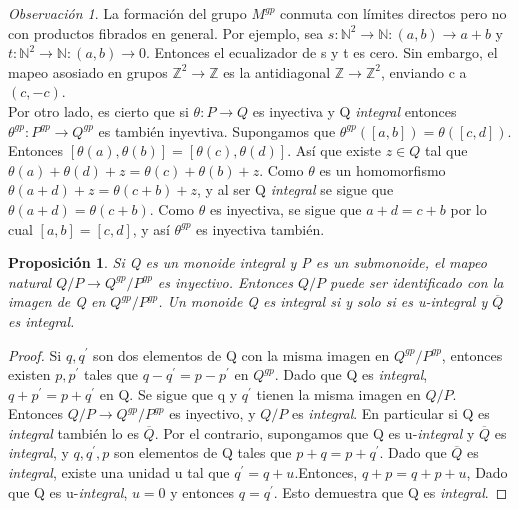 \documentclass[12pt,spanish]{amsart}
\newcommand{\bb}[1]{\mathbb{#1}}
\newtheorem{prop}[Theorem]{Proposición}
\theoremstyle{definition}
\theoremstyle{remark}
\newtheorem{obs}[Theorem]{Observación}
\begin{document}
\begin{obs}
La formación del grupo $M^{gp}$ conmuta con límites directos pero no con productos fibrados en general. Por ejemplo, sea $s:\bb{N}^{2} \to \bb{N}:(a,b)\to a+b$ y $t:\bb{N}^{2} \to \bb{N}:(a,b) \to 0$. Entonces el ecualizador de s y t es cero. Sin embargo, el mapeo asosiado en grupos $\bb{Z}^{2} \to \bb{Z}$ es la antidiagonal $\bb{Z} \to \bb{Z}^{2}$, enviando c a $(c,-c)$. \\

Por otro lado, es cierto que si $\theta:P \to Q$ es inyectiva y Q \textit{integral} entonces $\theta^{gp}:P^{gp} \to Q^{gp}$ es también inyevtiva. Supongamos que $\theta^{gp}([a,b])=\theta([c,d])$. Entonces $[\theta(a),\theta(b)]=[\theta(c),\theta(d)]$. Así que existe $z\in Q$ tal que $\theta(a)+\theta(d)+z=\theta(c)+\theta(b)+z$. Como $\theta$ es un homomorfismo $\theta(a+d)+z=\theta(c+b)+z$, y al ser Q \textit{integral} se sigue que $\theta(a+d)=\theta(c+b)$. Como $\theta$ es inyectiva, se sigue que $a+d=c+b$ por lo cual $[a,b]=[c,d]$, y así $\theta^{gp}$ es inyectiva también. 
\end{obs}

\begin{prop}
Si Q es un monoide \textit{integral} y P es un submonoide, el mapeo natural $Q/P \to Q^{gp}/P^{gp}$ es inyectivo. Entonces $Q/P$ puede ser identificado con la imagen de Q en $Q^{gp}/P^{gp}$. Un monoide Q es \textit{integral} si y solo si es u-\textit{integral} y $\overline{Q}$ es \textit{integral}.  
\end{prop}

\begin{proof}
Si $q,q^{\prime}$ son dos elementos de Q con la misma imagen en $Q^{gp}/P^{gp}$, entonces existen $p,p^{\prime}$ tales que $q-q^{\prime}=p-p^{\prime}$ en $Q^{gp}$. Dado que Q es \textit{integral}, $q+p^{\prime}=p+q^{\prime}$ en Q. Se sigue que q y $q^{\prime}$ tienen la misma imagen en $Q/P$. Entonces $Q/P \to Q^{gp}/P^{gp}$ es inyectivo, y $Q/P$ es \textit{integral}. En particular si Q es \textit{integral} también lo es $\overline{Q}$. Por el contrario, supongamos que Q es u-\textit{integral} y $\overline{Q}$ es \textit{integral}, y $q,q^{\prime},p$ son elementos de Q tales que $p+q=p+q^{\prime}$. Dado que $\overline{Q}$ es \textit{integral}, existe una unidad u tal que $q^{\prime}=q+u$.Entonces, $q+p=q+p+u$, Dado que Q es u-\textit{integral}, $u=0$ y entonces $q=q^{\prime}$. Esto demuestra que Q es \textit{integral}. 
\end{proof}
\end{document}
